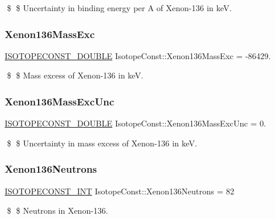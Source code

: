\$ \$ Uncertainty in binding energy per A of Xenon-\/136 in keV. \mbox{\label{group___isotope_const-_xenon-_xe136_ga747b7fa5754796ef12a2bdd9e197c1eb}} 
\subsubsection{\texorpdfstring{Xenon136\+Mass\+Exc}{Xenon136MassExc}}
{\footnotesize\ttfamily \mbox{\hyperlink{group___isotope_const-_macros_ga8f45a7272ce02c0b4c65c44636ed719a}{I\+S\+O\+T\+O\+P\+E\+C\+O\+N\+S\+T\+\_\+\+D\+O\+U\+B\+LE}} Isotope\+Const\+::\+Xenon136\+Mass\+Exc = -\/86429.}

\$ \$ Mass excess of Xenon-\/136 in keV. \mbox{\label{group___isotope_const-_xenon-_xe136_ga6cf57f5fe270e436f9cfb55131926d40}} 
\subsubsection{\texorpdfstring{Xenon136\+Mass\+Exc\+Unc}{Xenon136MassExcUnc}}
{\footnotesize\ttfamily \mbox{\hyperlink{group___isotope_const-_macros_ga8f45a7272ce02c0b4c65c44636ed719a}{I\+S\+O\+T\+O\+P\+E\+C\+O\+N\+S\+T\+\_\+\+D\+O\+U\+B\+LE}} Isotope\+Const\+::\+Xenon136\+Mass\+Exc\+Unc = 0.}

\$ \$ Uncertainty in mass excess of Xenon-\/136 in keV. \mbox{\label{group___isotope_const-_xenon-_xe136_ga02e0064eaf34be42b8e51cfbd667db52}} 
\subsubsection{\texorpdfstring{Xenon136\+Neutrons}{Xenon136Neutrons}}
{\footnotesize\ttfamily \mbox{\hyperlink{group___isotope_const-_macros_ga5f18360b3e99483a35c32d789e62621c}{I\+S\+O\+T\+O\+P\+E\+C\+O\+N\+S\+T\+\_\+\+I\+NT}} Isotope\+Const\+::\+Xenon136\+Neutrons = 82}

\$ \$ Neutrons in Xenon-\/136. \mbox{\label{group___isotope_const-_xenon-_xe136_ga5499858eeae539d15d0d068252493918}} 
